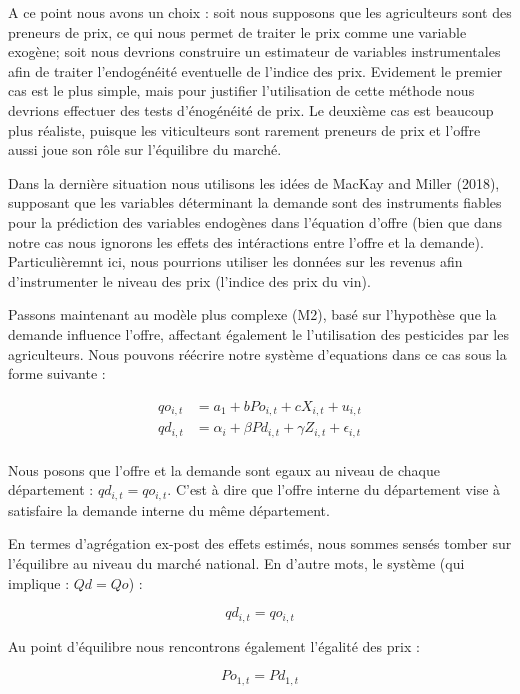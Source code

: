 \documentclass[11pt,]{article}
\begin{document}
A ce point nous avons un choix : soit nous supposons que les
agriculteurs sont des preneurs de prix, ce qui nous permet de traiter le
prix comme une variable exogène; soit nous devrions construire un
estimateur de variables instrumentales afin de traiter l'endogénéité
eventuelle de l'indice des prix. Evidement le premier cas est le plus
simple, mais pour justifier l'utilisation de cette méthode nous devrions
effectuer des tests d'énogénéité de prix. Le deuxième cas est beaucoup
plus réaliste, puisque les viticulteurs sont rarement preneurs de prix
et l'offre aussi joue son rôle sur l'équilibre du marché.

Dans la dernière situation nous utilisons les idées de MacKay and Miller
(2018), supposant que les variables déterminant la demande sont des
instruments fiables pour la prédiction des variables endogènes dans
l'équation d'offre (bien que dans notre cas nous ignorons les effets des
intéractions entre l'offre et la demande). Particulièremnt ici, nous
pourrions utiliser les données sur les revenus afin d'instrumenter le
niveau des prix (l'indice des prix du vin).

Passons maintenant au modèle plus complexe (M2), basé sur l'hypothèse
que la demande influence l'offre, affectant également le l'utilisation
des pesticides par les agriculteurs. Nous pouvons réécrire notre système
d'equations dans ce cas sous la forme suivante :

\begin{align*}
  qo_{i,t} & = a_1 + b Po_{i,t} + c X_{i,t} + u_{i,t} \\ 
  qd_{i,t} & = \alpha_{i} + \beta Pd_{i,t} + \gamma Z_{i,t} + \epsilon_{i,t}  \\
\end{align*}

Nous posons que l'offre et la demande sont egaux au niveau de chaque
département : \(qd_{i,t} = qo_{i,t}\). C'est à dire que l'offre interne
du département vise à satisfaire la demande interne du même département.

En termes d'agrégation ex-post des effets estimés, nous sommes sensés
tomber sur l'équilibre au niveau du marché national. En d'autre mots, le
système (qui implique : \(Qd = Qo\)) :

\begin{equation*}
  qd_{i,t} = qo_{i,t}
\end{equation*}

Au point d'équilibre nous rencontrons également l'égalité des prix :

\begin{equation*}
  Po_{1,t} = Pd_{1,t}
\end{equation*}
\end{document}

